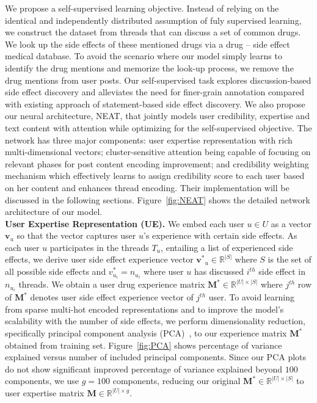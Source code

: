\documentclass{bmcart}
\begin{document}
We propose a self-supervised learning objective. Instead of relying on the identical and independently distributed assumption of fuly supervised learning, we construct the dataset from threads that can discuss a set of common drugs. We look up the side effects of these mentioned drugs via a drug -- side effect medical database. To avoid the scenario where our model simply learns to identify the drug mentions and memorize the look-up process, we remove the drug mentions from user posts. Our self-supervised task explores discussion-based side effect discovery and alleviates the need for finer-grain annotation compared with existing approach of statement-based side effect discovery.
We also propose our neural architecture, NEAT, that jointly models user credibility, expertise and text content with attention while optimizing for the self-supervised objective.
The network has three major components: user expertise representation with rich multi-dimensional vectors; cluster-sensitive attention being capable of focusing on relevant phases for post content encoding improvement; and credibility weighting mechanism which effectively learns to assign credibility score to each user based on her content and enhances thread encoding. Their implementation will be discussed in the following sections. Figure~\ref{fig:NEAT} shows the detailed network architecture of our model. \\

\textbf{User Expertise Representation (UE).}  We embed each user $u
\in U$ as a vector $\boldsymbol{v}_{u}$ so that the vector captures
user $u$'s experience with certain side effects. As each user $u$
participates in the threads $T_u$, entailing a list of experienced
side effects, we derive user side effect experience vector $\boldsymbol{v^{\ast}}_{u}
\in \mathbb{R}^{|S|}$ where $S$ is the set of all possible side effects and
$v^{\ast}_{u_i}=n_{u_i}$ where user $u$ has discussed $i^{th}$ side effect in $n_{u_i}$ threads. We obtain a user drug experience matrix
$\boldsymbol{M}^{\ast} \in \mathbb{R}^{|U|\times|S|}$ where $j^{th}$
row of $\boldsymbol{M}^{\ast}$ denotes user side effect experience vector of $j^{th}$ user. To avoid learning from sparse multi-hot encoded representations and to improve the model's scalability with the number of side effects, we perform  dimensionality reduction, specifically principal component analysis (PCA)~\cite{jolliffe1986principal}, to our experience matrix $\boldsymbol{M}^{\ast}$ obtained from training set.
Figure~\ref{fig:PCA} shows percentage of variance explained versus
number of included principal components. Since our PCA plots do not show significant improved percentage of variance explained beyond $100$ components, we use $g=100$ components, reducing
our original $\boldsymbol{M}^{\ast}\in \mathbb{R}^{|U|\times|S|}$ to
user expertise matrix $\boldsymbol{M} \in \mathbb{R}^{|U| \times g}$. \\
\end{document}
